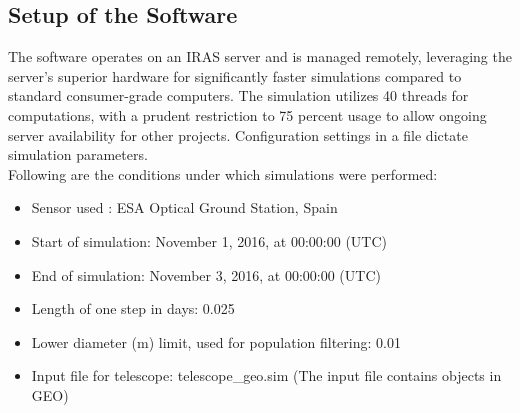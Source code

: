 \subsection{Setup of the Software}

The software operates on an IRAS server and is managed remotely, leveraging the server's superior hardware for significantly faster simulations compared to standard consumer-grade computers. The simulation utilizes 40 threads for computations, with a prudent restriction to 75 percent usage to allow ongoing server availability for other projects. Configuration settings in a file dictate simulation parameters.\\
Following are the conditions under which simulations were performed:\\
\begin{itemize}
	\item Sensor used : ESA Optical Ground Station, Spain
    \item Start of simulation: November 1, 2016, at 00:00:00 (UTC)
    \item End of simulation: November 3, 2016, at 00:00:00 (UTC)
    \item Length of one step in days: 0.025
    \item Lower diameter (m) limit, used for population filtering: 0.01
    \item Input file for telescope: telescope\_geo.sim (The input file contains objects in GEO)
\end{itemize}


